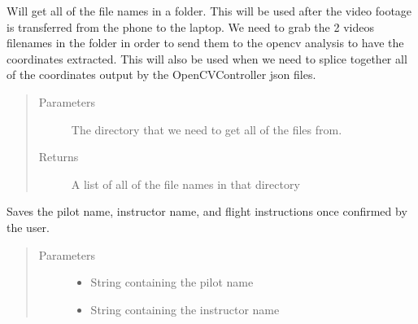 \documentclass[letterpaper,10pt,english]{sphinxmanual}
\begin{document}
\begin{fulllineitems}
\begin{fulllineitems}
\label{\detokenize{index:src.Controllers.Program_Controller.Controller.get_all_files}}
Will get all of the file names in a folder. This will be used after the video footage is transferred from
the phone to the laptop. We need to grab the 2 videos filenames in the folder in order to send them to
the opencv analysis to have the coordinates extracted. This will also be used when we need to splice
together all of the coordinates output by the OpenCVController json files.
\begin{quote}\begin{description}
\item[{Parameters}] \leavevmode
{} \textendash{} The directory that we need to get all of the files from.

\item[{Returns}] \leavevmode
A list of all of the file names in that directory

\end{description}\end{quote}

\end{fulllineitems}


\begin{fulllineitems}
\label{\detokenize{index:src.Controllers.Program_Controller.Controller.get_flight_info}}
Saves the pilot name, instructor name, and flight instructions once confirmed by the user.
\begin{quote}\begin{description}
\item[{Parameters}] \leavevmode\begin{itemize}
\item {} 
 \textendash{} String containing the pilot name

\item {} 
 \textendash{} String containing the instructor name


\end{itemize}
\end{description}
\end{quote}
\end{fulllineitems}
\end{fulllineitems}
\end{document}
